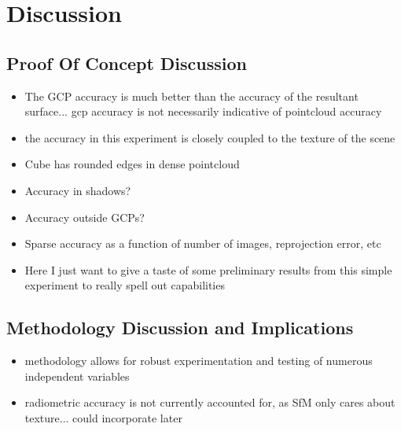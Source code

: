 \section{Discussion}

\subsection{Proof Of Concept Discussion}
\begin{itemize}
	\item The GCP accuracy is much better than the accuracy of the resultant surface... gcp accuracy is not necessarily indicative of pointcloud accuracy
	\item the accuracy in this experiment is closely coupled to the texture of the scene
	\item Cube has rounded edges in dense pointcloud
	\item Accuracy in shadows?
	\item Accuracy outside GCPs?
	\item Sparse accuracy as a function of number of images, reprojection error, etc
	\item Here I just want to give a taste of some preliminary results from this simple experiment to really spell out capabilities
\end{itemize}

\subsection{Methodology Discussion and Implications}
\begin{itemize}
	\item methodology allows for robust experimentation and testing of numerous independent variables
	\item radiometric accuracy is not currently accounted for, as SfM only cares about texture... could incorporate later
\end{itemize}